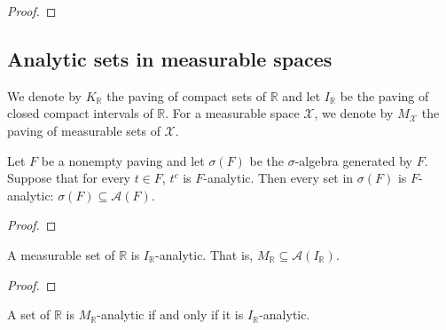 \begin{proof}\leanok

\end{proof}



\subsection{Analytic sets in measurable spaces}

We denote by $K_{\mathbb{R}}$ the paving of compact sets of $\mathbb{R}$ and let $I_{\mathbb{R}}$ be the paving of closed compact intervals of $\mathbb{R}$.
For a measurable space $\mathcal{X}$, we denote by $M_{\mathcal{X}}$ the paving of measurable sets of $\mathcal{X}$.

\begin{lemma}\label{lem:isPavingAnalytic_of_measurableSet_generateFrom}
  \leanok
Let $F$ be a nonempty paving and let $\sigma(F)$ be the $\sigma$-algebra generated by $F$.
Suppose that for every $t \in F$, $t^c$ is $F$-analytic.
Then every set in $\sigma(F)$ is $F$-analytic: $\sigma(F) \subseteq \mathcal{A}(F)$.
\end{lemma}

\begin{proof}\leanok

\end{proof}


\begin{lemma}\label{lem:MeasurableSet.isPavingAnalytic_Icc}
  \leanok
A measurable set of $\mathbb{R}$ is $I_{\mathbb{R}}$-analytic.
That is, $M_{\mathbb{R}} \subseteq \mathcal{A}(I_{\mathbb{R}})$.
\end{lemma}

\begin{proof}\leanok

\end{proof}


\begin{lemma}\label{lem:isPavingAnalytic_measurableSet_iff_isPavingAnalytic_Icc}
  \leanok
A set of $\mathbb{R}$ is $M_{\mathbb{R}}$-analytic if and only if it is $I_{\mathbb{R}}$-analytic.
\end{lemma}

